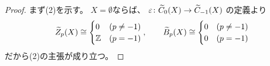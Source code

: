 \documentclass[report]{jlreq}
\begin{document}
\begin{proof}
    まず(2)を示す。
    $X = \emptyset$ならば、
    $\varepsilon \colon \widetilde{C}_0(X) \to \widetilde{C}_{-1}(X)$
    の定義より
    \begin{equation}
        \widetilde{Z}_p(X) \cong \begin{cases}
            0 & (p \neq -1) \\
            \mathbb{Z} & (p = -1)
        \end{cases},
        \qquad
        \widetilde{B}_p(X) \cong \begin{cases}
            0 & (p \neq -1) \\
            0 & (p = -1)
        \end{cases}
    \end{equation}
    だから(2)の主張が成り立つ。


\end{proof}
\end{document}
